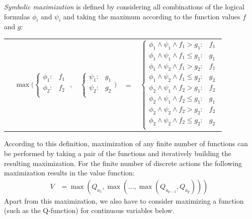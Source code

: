 \documentclass[letterpaper]{article}
\renewcommand{\-}{\text{-}}
\begin{document}
\emph{Symbolic maximization} is defined by considering all combinations of the logical formulas $\phi_i$ and $\psi_i$ and taking the maximum according to the function values $f$ and $g$:
\vspace{-5mm}

{\footnotesize
\begin{center}
\begin{tabular}{r c c c l}
&
\hspace{-9mm} $\max \Bigg(
  \begin{cases}
    \phi_1: & f_1 \\ 
    \phi_2: & f_2 \\ 
  \end{cases}$
$,$
&
\hspace{-4mm}
  $\begin{cases}
    \psi_1: & g_1 \\ 
    \psi_2: & g_2 \\ 
  \end{cases} \Bigg)$
&
\hspace{-4mm} 
$ = $
&
\hspace{-4mm}
  $\begin{cases}
  \phi_1 \wedge \psi_1 \wedge f_1 > g_1    : & f_1 \\ 
  \phi_1 \wedge \psi_1 \wedge f_1 \leq g_1 : & g_1 \\ 
  \phi_1 \wedge \psi_2 \wedge f_1 > g_2    : & f_1 \\ 
  \phi_1 \wedge \psi_2 \wedge f_1 \leq g_2 : & g_2 \\ 
  \phi_2 \wedge \psi_1 \wedge f_2 > g_1    : & f_2 \\ 
  \phi_2 \wedge \psi_1 \wedge f_2 \leq g_1 : & g_1 \\ 
  \phi_2 \wedge \psi_2 \wedge f_2 > g_2    : & f_2 \\ 
  \phi_2 \wedge \psi_2 \wedge f_2 \leq g_2 : & g_2 \\ 
  \end{cases}$
\end{tabular}
\end{center}
}

According to this definition, maximization of any finite number of functions can be performed by taking a pair of the functions and iteratively building the resulting maximization. For the finite number of discrete actions the following maximization results in the value function: 
\begin{align*}
V & = 
\max(Q_{a_1},\max(\ldots,\max(Q_{a_{p-1}},Q_{a_p})))
\end{align*}
Apart from this maximization, we also have to consider maximizing a function (such as the Q-function) for continuous variables below.
\end{document}
